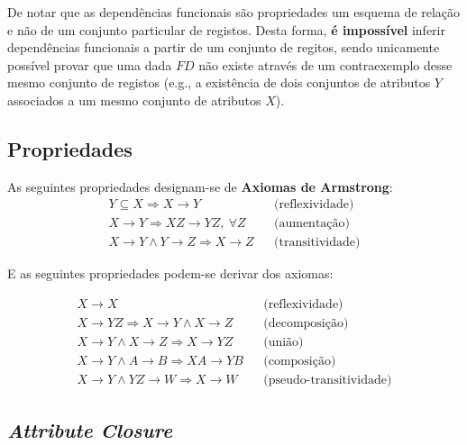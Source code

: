 \documentclass[oneside]{book}
\theoremstyle{definition}
\begin{document}
De notar que as dependências funcionais são propriedades um esquema de relação e não de um conjunto particular de registos. Desta forma, \textbf{é impossível} inferir dependências funcionais a partir de um conjunto de regitos, sendo unicamente possível provar que uma dada $FD$ não existe através de um contraexemplo desse mesmo conjunto de registos (e.g., a existência de dois conjuntos de atributos $Y$ associados a um mesmo conjunto de atributos $X$).

\subsection{Propriedades}

As seguintes propriedades designam-se de \textbf{Axiomas de Armstrong}:
\vspace{-0.3em}
\begin{align*}
    Y \subseteq X \Rightarrow X \rightarrow Y &&\text{(reflexividade)} \\
    X \rightarrow Y \Rightarrow XZ \rightarrow YZ, \: \forall Z  &&\text{(aumentação)} \\
    X \rightarrow Y \wedge Y \rightarrow Z \Rightarrow X \rightarrow Z &&\text{(transitividade)}
\end{align*}

\pagebreak
E as seguintes propriedades podem-se derivar dos axiomas:

\vspace{-0.3em}
\begin{align*}
    X \rightarrow X &&\text{(reflexividade)} \\
    X \rightarrow YZ \Rightarrow X \rightarrow Y \wedge X \rightarrow Z &&\text{(decomposição)} \\
    X \rightarrow Y \wedge X \rightarrow Z \Rightarrow X \rightarrow YZ &&\text{(união)} \\
    X \rightarrow Y \wedge A \rightarrow B \Rightarrow XA \rightarrow YB &&\text{(composição)} \\
    X \rightarrow Y \wedge YZ \rightarrow W \Rightarrow X \rightarrow W &&\text{(pseudo-transitividade)}
\end{align*}

\subsection{\textit{Attribute Closure}}
\end{document}
